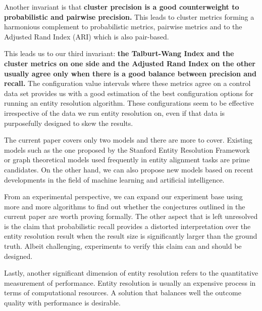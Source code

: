 \documentclass[journal]{IEEEtran}
\begin{document}
    Another invariant is that \textbf{cluster precision is a good counterweight
    to probabilistic and pairwise precision.}
    This leads to cluster metrics forming a harmonious complement to
    probabilistic metrics, pairwise metrics and to the Adjusted Rand Index (ARI)
    which is also pair-based.
    
    This leads us to our third invariant: \textbf{the Talburt-Wang Index and the
    cluster metrics on one side and the Adjusted Rand Index on the other usually
    agree only when there is a good balance between precision and recall.}
    The configuration value intervals where these metrics agree on a control
    data set provides us with a good estimation of the best configuration
    options for running an entity resolution algorithm.
    These configurations seem to be effective irrespective of the data we run
    entity resolution on, even if that data is purposefully designed to skew the
    results.


    The current paper covers only two models and there are more to cover.
    Existing models such as the one proposed by the Stanford Entity Resolution
    Framework\cite{Ben2009Swoosh} or graph theoretical models used frequently in
    entity alignment tasks are prime candidates.
    On the other hand, we can also propose new models based on recent
    developments in the field of machine learning and artificial intelligence.

    From an experimental perspective, we can expand our experiment base using
    more and more algorithms to find out whether the conjectures outlined in
    the current paper are worth proving formally.
    The other aspect that is left unresolved is the claim that probabilistic
    recall provides a distorted interpretation over the entity resolution result
    when the result size is significantly larger than the ground truth.
    Albeit challenging, experiments to verify this claim can and should be
    designed.

    Lastly, another significant dimension of entity resolution refers to the
    quantitative measurement of performance.
    Entity resolution is usually an expensive process in terms of computational
    resources.
    A solution that balances well the outcome quality with performance is
    desirable.

    \balance
    
    
\end{document}
